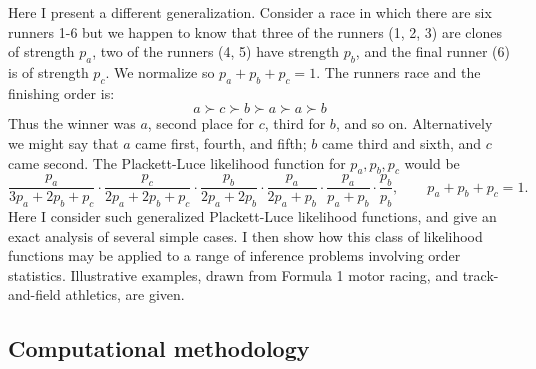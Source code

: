 \documentclass[article]{jss}
\begin{document}
Here I present a different generalization.  Consider a race in which
there are six runners 1-6 but we happen to know that three of the
runners (1, 2, 3) are clones of strength $p_a$, two of the runners (4, 5)
have strength $p_b$, and the final runner (6) is of strength $p_c$.
We normalize so $p_a+p_b+p_c=1$.  The runners race and the finishing
order is:
%
$$a\succ c\succ b\succ a\succ a \succ b$$
%
Thus the winner was $a$, second place for $c$, third for $b$, and so
on.  Alternatively we might say that $a$ came first, fourth, and
fifth; $b$ came third and sixth, and $c$ came second.  The
Plackett-Luce likelihood function for $p_a, p_b, p_c$ would be
%
\begin{equation}\label{plackettluce}
\frac{p_a}{3p_a+2p_b+p_c}\cdot
\frac{p_c}{2p_a+2p_b+p_c}\cdot
\frac{p_b}{2p_a+2p_b    }\cdot
\frac{p_a}{2p_a+ p_b    }\cdot
\frac{p_a}{ p_a+ p_b    }\cdot
\frac{p_b}{      p_b    },\qquad p_a+p_b+p_c=1.
\end{equation}
%
Here I consider such generalized Plackett-Luce likelihood functions,
and give an exact analysis of several simple cases.  I then show how
this class of likelihood functions may be applied to a range of
inference problems involving order statistics.  Illustrative examples,
drawn from Formula 1 motor racing, and track-and-field athletics, are
given.

\subsection{Computational methodology}
\end{document}
